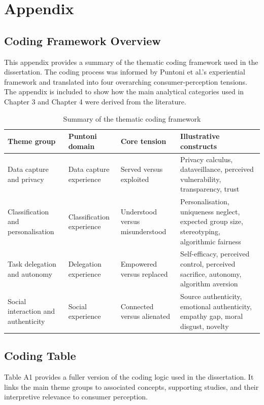 \chapter{Appendix}

\section{Coding Framework Overview}
This appendix provides a summary of the thematic coding framework used in the dissertation. The coding process was informed by Puntoni et al.'s experiential framework and translated into four overarching consumer-perception tensions. The appendix is included to show how the main analytical categories used in Chapter 3 and Chapter 4 were derived from the literature.

\begin{table}[h!]
\centering
\caption{Summary of the thematic coding framework}
\begin{tabular}{p{3cm}p{3.2cm}p{3.3cm}p{4cm}}
\toprule
\textbf{Theme group} & \textbf{Puntoni domain} & \textbf{Core tension} & \textbf{Illustrative constructs} \\
\midrule
Data capture and privacy & Data capture experience & Served versus exploited & Privacy calculus, dataveillance, perceived vulnerability, transparency, trust \\
\midrule
Classification and personalisation & Classification experience & Understood versus misunderstood & Personalisation, uniqueness neglect, expected group size, stereotyping, algorithmic fairness \\
\midrule
Task delegation and autonomy & Delegation experience & Empowered versus replaced & Self-efficacy, perceived control, perceived sacrifice, autonomy, algorithm aversion \\
\midrule
Social interaction and authenticity & Social experience & Connected versus alienated & Source authenticity, emotional authenticity, empathy gap, moral disgust, novelty \\
\bottomrule
\end{tabular}
\end{table}

\section{Coding Table}
Table A1 provides a fuller version of the coding logic used in the dissertation. It links the main theme groups to associated concepts, supporting studies, and their interpretive relevance to consumer perception.

